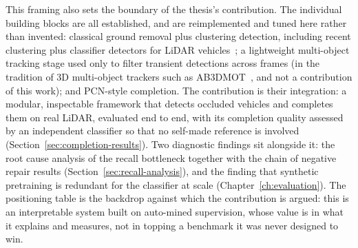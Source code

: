 \documentclass[a4paper,12pt]{report}
\begin{document}
This framing also sets the boundary of the thesis's contribution. The individual
building blocks are all established, and are reimplemented and tuned here rather than
invented: classical ground removal plus clustering detection, including recent
clustering plus classifier detectors for LiDAR vehicles~\cite{lim2025longrange}; a
lightweight multi-object tracking stage used only to filter transient detections across
frames (in the tradition of 3D multi-object trackers such as
AB3DMOT~\cite{weng2020ab3dmot}, and not a contribution of this work); and PCN-style
completion. The contribution is their integration: a modular, inspectable framework
that detects occluded vehicles and completes them on real
LiDAR, evaluated end to end, with its completion quality assessed by an independent
classifier so that no self-made reference is involved
(Section~\ref{sec:completion-results}). Two diagnostic findings sit alongside it: the
root cause analysis of the recall bottleneck together with the chain of negative repair
results (Section~\ref{sec:recall-analysis}), and the finding that synthetic pretraining is
redundant for the classifier at scale (Chapter~\ref{ch:evaluation}). The positioning table
is the backdrop against which the contribution is argued: this is an interpretable system
built on auto-mined supervision, whose value is in what it explains and measures, not in
topping a benchmark it was never designed to win.
\end{document}
